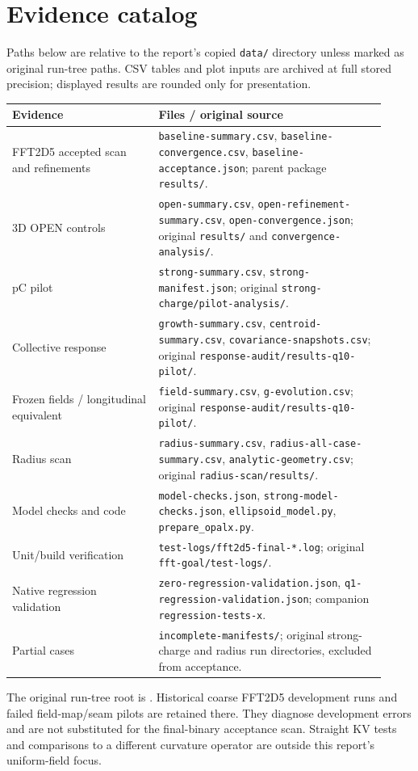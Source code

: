 \documentclass[10pt,a4paper]{article}
\newcommand{\code}[1]{{\small\nolinkurl{#1}}}
\begin{document}
\section{Evidence catalog}
Paths below are relative to the report's copied \code{data/} directory unless
marked as original run-tree paths. CSV tables and plot inputs are archived at
full stored precision; displayed results are rounded only for presentation.
\begin{center}\footnotesize
\begin{tabular}{>{\raggedright\arraybackslash}p{0.36\linewidth}>{\raggedright\arraybackslash}p{0.56\linewidth}}\toprule
Evidence & Files / original source\\\midrule
FFT2D5 accepted scan and refinements & \code{baseline-summary.csv},
\code{baseline-convergence.csv}, \code{baseline-acceptance.json}; parent
package \code{results/}.\\
3D OPEN controls & \code{open-summary.csv}, \code{open-refinement-summary.csv},
\code{open-convergence.json}; original \code{results/} and \code{convergence-analysis/}.\\
10 pC pilot & \code{strong-summary.csv}, \code{strong-manifest.json}; original
\code{strong-charge/pilot-analysis/}.\\
Collective response & \code{growth-summary.csv}, \code{centroid-summary.csv},
\code{covariance-snapshots.csv}; original \code{response-audit/results-q10-pilot/}.\\
Frozen fields / longitudinal equivalent & \code{field-summary.csv},
\code{g-evolution.csv}; original \code{response-audit/results-q10-pilot/}.\\
Radius scan & \code{radius-summary.csv}, \code{radius-all-case-summary.csv},
\code{analytic-geometry.csv}; original \code{radius-scan/results/}.\\
Model checks and code & \code{model-checks.json}, \code{strong-model-checks.json},
\code{ellipsoid_model.py}, \code{prepare_opalx.py}.\\
Unit/build verification & \code{test-logs/fft2d5-final-*.log}; original
\code{fft-goal/test-logs/}.\\
Native regression validation & \code{zero-regression-validation.json},
\code{q1-regression-validation.json}; companion \code{regression-tests-x}.\\
Partial cases & \code{incomplete-manifests/}; original strong-charge and radius
run directories, excluded from acceptance.\\\bottomrule
\end{tabular}
\end{center}
The original run-tree root is
.
Historical coarse FFT2D5 development runs and failed field-map/seam pilots are
retained there. They diagnose development errors and are not substituted for
the final-binary acceptance scan. Straight KV tests and comparisons to a
different curvature operator are outside this report's uniform-field focus.
\end{document}
